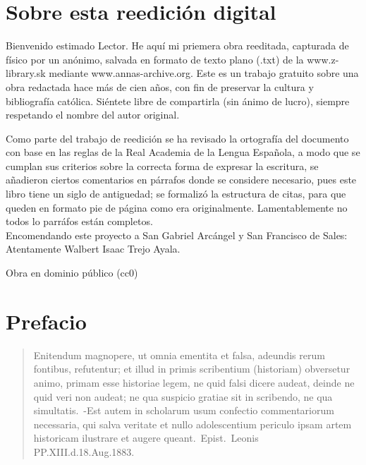 \raggedbottom{} \documentclass[12pt, a4paper, openany]{book} %
\begin{document}
\section{Sobre esta reedición digital} %
Bienvenido estimado Lector. He aquí mi priemera obra reeditada, capturada de físico por un anónimo, salvada en formato de texto plano (.txt) de la www.z-library.sk mediante www.annas-archive.org\@. Este es un trabajo gratuito sobre una obra redactada hace más de cien años, con fin de preservar la cultura y bibliografía católica. Siéntete libre de compartirla (sin ánimo de lucro), siempre respetando el nombre del autor original.

Como parte del trabajo de reedición se ha revisado la ortografía del documento con base en las reglas de la Real Academia de la Lengua Española, a modo que se cumplan sus criterios sobre la correcta forma de expresar la escritura, se añadieron ciertos comentarios en párrafos donde se considere necesario, pues este libro tiene un siglo de antiguedad; se formalizó la estructura de citas, para que queden en formato pie de página como era originalmente. Lamentablemente no todos lo parráfos están completos.\\
Encomendando este proyecto a San Gabriel Arcángel y San Francisco de Sales: Atentamente Walbert Isaac Trejo Ayala.

Obra en dominio público (cc0)
\section{Prefacio}
\begin{quotation}
  Enitendum magnopere, ut omnia ementita et falsa, adeundis rerum fontibus, refutentur; et illud in primis scribentium (historiam) obversetur animo, primam esse historiae legem, ne quid falsi dicere audeat, deinde ne quid veri non audeat; ne qua suspicio gratiae sit in scribendo, ne qua simultatis.\ -Est autem in scholarum usum confectio commentariorum necessaria, qui salva veritate et nullo adolescentium periculo ipsam artem historicam ilustrare et augere queant.\ Epist.\ Leonis PP.\@ XIII.\@ d.\@ 18.\@ Aug.\@ 1883.
\end{quotation}
\end{document}
